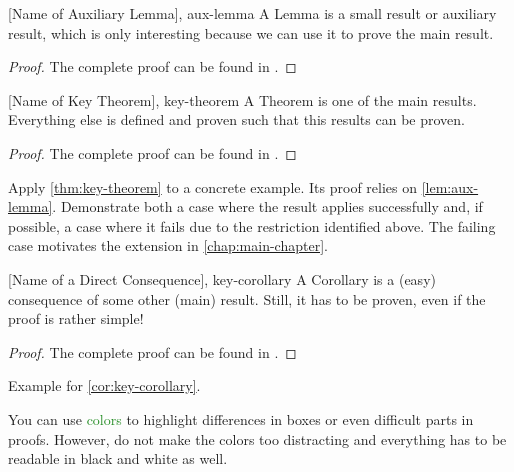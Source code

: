 
\begin{Lemma}{[Name of Auxiliary Lemma], \cite{giesl2006mechanizing}}{aux-lemma}
    A Lemma is a small result or auxiliary result, which is only interesting because 
    we can use it to prove the main result.
\end{Lemma}

\begin{proof}
    The complete proof can be found in \cite{giesl2006mechanizing}.
\end{proof}

\begin{Theorem}{[Name of Key Theorem], \cite{giesl2006mechanizing}}{key-theorem}
    A Theorem is one of the main results. Everything else is defined and proven such
    that this results can be proven.
\end{Theorem}

\begin{proof}
    The complete proof can be found in \cite{giesl2006mechanizing}.
\end{proof}

\begin{example}\label{ex:key-theorem}
    Apply \cref{thm:key-theorem} to a concrete example.
    Its proof relies on \cref{lem:aux-lemma}.
    Demonstrate both a case where the result applies successfully and,
    if possible, a case where it fails due to the restriction identified above.
    The failing case motivates the extension in \cref{chap:main-chapter}.
\end{example}

\begin{Corollary}{[Name of a Direct Consequence], \cite{giesl2006mechanizing}}{key-corollary}
    A Corollary is a (easy) consequence of some other (main) result. 
    Still, it has to be proven, even if the proof is rather simple!
\end{Corollary}

\begin{proof}
    The complete proof can be found in \cite{giesl2006mechanizing}.
\end{proof}

\begin{example}\label{ex:key-corollary}
    Example for \cref{cor:key-corollary}.
\end{example}


You can use \textcolor{ForestGreen}{colors} to highlight differences in boxes 
or even difficult parts in proofs. 
However, do not make the colors too distracting and everything has to be
readable in black and white as well.